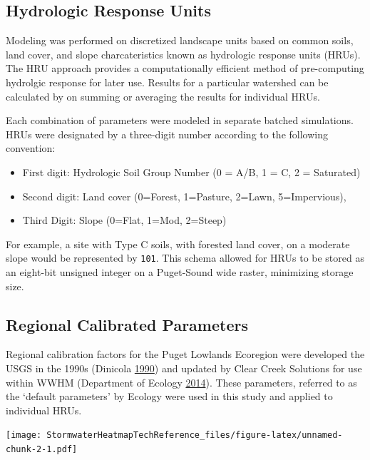 \documentclass[
]{report}
\providecommand{\tightlist}{%
  \setlength{\itemsep}{0pt}\setlength{\parskip}{0pt}}
\begin{document}
\hypertarget{hydrologic-response-units}{%
\subsection{Hydrologic Response Units}\label{hydrologic-response-units}}

Modeling was performed on discretized landscape units based on common soils, land cover, and slope charcateristics known as hydrologic response units (HRUs). The HRU approach provides a computationally efficient method of pre-computing hydrolgic response for later use. Results for a particular watershed can be calculated by on summing or averaging the results for individual HRUs.

Each combination of parameters were modeled in separate batched simulations. HRUs were designated by a three-digit number according to the following convention:

\begin{itemize}
\tightlist
\item
  First digit: Hydrologic Soil Group Number (0 = A/B, 1 = C, 2 = Saturated)
\item
  Second digit: Land cover (0=Forest, 1=Pasture, 2=Lawn, 5=Impervious),
\item
  Third Digit: Slope (0=Flat, 1=Mod, 2=Steep)
\end{itemize}

For example, a site with Type C soils, with forested land cover, on a moderate slope would be represented by \texttt{101}. This schema allowed for HRUs to be stored as an eight-bit unsigned integer on a Puget-Sound wide raster, minimizing storage size.

\hypertarget{regional-calibrated-parameters}{%
\subsection{Regional Calibrated Parameters}\label{regional-calibrated-parameters}}

Regional calibration factors for the Puget Lowlands Ecoregion were developed the USGS in the 1990s (Dinicola \protect\hyperlink{ref-Dinicola1990}{1990}) and updated by Clear Creek Solutions for use within WWHM (Department of Ecology \protect\hyperlink{ref-DepartmentofEcology2014}{2014}). These parameters, referred to as the `default parameters' by Ecology were used in this study and applied to individual HRUs.

\texttt{[image: StormwaterHeatmapTechReference\_files/figure-latex/unnamed-chunk-2-1.pdf]}
\end{document}
